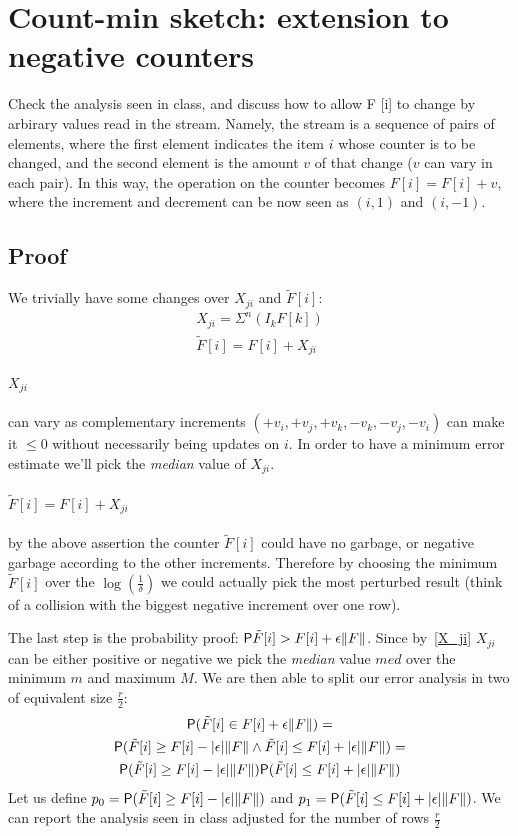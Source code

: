 \section{Count-min sketch: extension to negative counters}

Check the analysis seen in class, and discuss how to allow F [i] to change by arbirary
values read in the stream.
Namely, the stream is a sequence of pairs of elements, where the first element indicates the
item $i$ whose counter is to be changed, and the second element is the amount $v$ of that
change ($v$ can vary in each pair).
In this way, the operation on the counter becomes $F[i] = F[i] + v$, where the increment
and decrement can be now seen as $(i, 1)$ and $(i, -1)$.

\subsection{Proof}

We trivially have some changes over $X_{ji}$ and $\tilde{F}[i]$:
    \begin{gather*}
        X_{ji} = \Sigma^{n}(I_k F[k]) \\
        \tilde{F}[i] = F[i] + X_{ji}
    \end{gather*}
\label{X_ji}\paragraph{$X_{ji}$} can vary as complementary increments $(+v_i, +v_j, +v_k, -v_k, -v_j, -v_i)$
can make it $\leq 0$ without necessarily being updates on $i$.
In order to have a minimum error estimate we'll pick the \emph{median} value of $X_{ji}$.
\label{f_tilde}~\paragraph{$\tilde{F}[i] = F[i] + X_{ji}$} by the above assertion the counter $\tilde{F}[i]$ could have no garbage, or negative
garbage according to the other increments.
Therefore by choosing the minimum $\tilde{F}[i]$ over the $\log(\frac{1}{\delta})$ we
could actually pick the most perturbed result (think of a collision with the
biggest negative increment over one row).

\label{probability}The last step is the probability proof: $\mathsf{P}{\tilde{F}[i] > F[i] + \epsilon \lVert F\rVert}$.
Since by~\ref{X_ji} $X_{ji}$ can be either positive or negative we pick the \emph{median}
value $med$ over the minimum $m$ and maximum $M$.
We are then able to split our error analysis in two of equivalent size $\frac{r}{2}$:
\begin{gather*}
\mathsf{P}(\tilde{F}[i] \in F[i] + \epsilon \lVert F\rVert) = \\
\mathsf{P}(\tilde{F}[i] \geq F[i] - \lvert\epsilon\rvert \lVert F\rVert \wedge \tilde{F}[i] \leq F[i] + \lvert\epsilon\rvert \lVert F\rVert) = \\
\mathsf{P}(\tilde{F}[i] \geq F[i] - \lvert\epsilon\rvert \lVert F\rVert) \mathsf{P}(\tilde{F}[i] \leq F[i] + \lvert\epsilon\rvert \lVert F\rVert)
\end{gather*}
Let us define $p_0 = \mathsf{P}(\tilde{F}[i] \geq F[i] - \lvert\epsilon\rvert \lVert F\rVert)$ and
$p_1 = \mathsf{P}(\tilde{F}[i] \leq F[i] + \lvert\epsilon\rvert \lVert F\rVert)$.
We can report the analysis seen in class adjusted for the number of rows $\frac{r}{2}$

